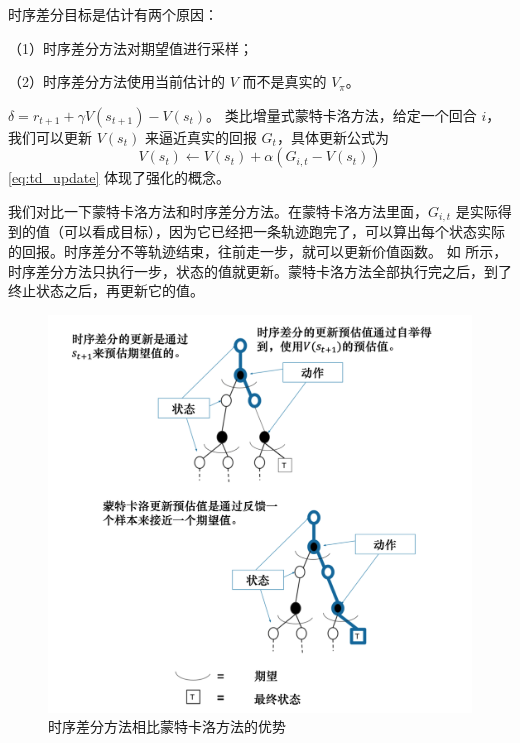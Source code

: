 	
时序差分目标是估计有两个原因：

（1）时序差分方法对期望值进行采样；

（2）时序差分方法使用当前估计的 $V$ 而不是真实的 $V_{\pi}$。

 $\delta=r_{t+1}+\gamma V(s_{t+1})-V(s_t)$。
类比增量式蒙特卡洛方法，给定一个回合 $i$，我们可以更新 $V(s_t)$ 来逼近真实的回报 $G_t$，具体更新公式为
	\begin{equation}
		V\left(s_{t}\right) \leftarrow V\left(s_{t}\right)+\alpha\left(G_{i, t}-V\left(s_{t}\right)\right)
	\end{equation}
\eqref{eq:td_update} 体现了强化的概念。

我们对比一下蒙特卡洛方法和时序差分方法。在蒙特卡洛方法里面，$G_{i,t}$ 是实际得到的值（可以看成目标），因为它已经把一条轨迹跑完了，可以算出每个状态实际的回报。时序差分不等轨迹结束，往前走一步，就可以更新价值函数。 
如 所示，时序差分方法只执行一步，状态的值就更新。蒙特卡洛方法全部执行完之后，到了终止状态之后，再更新它的值。
\begin{figure}[htb]
	\centering
	\includegraphics[width=0.5\linewidth]{res/ch3/TD_3}
	\caption{时序差分方法相比蒙特卡洛方法的优势}
	\label{fig:advantage_td}
\end{figure}

